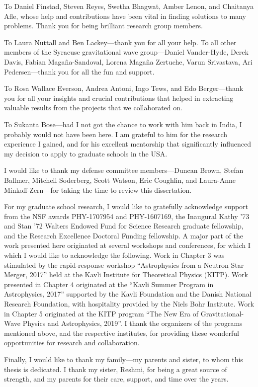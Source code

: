 To Daniel Finstad, Steven Reyes, Swetha Bhagwat, Amber Lenon, and Chaitanya Afle, whose help and contributions have been vital in finding solutions to many problems. Thank you for being brilliant research group members.

To Laura Nuttall and Ben Lackey---thank you for all your help. To all other members of the Syracuse gravitational wave group---Daniel Vander-Hyde, Derek Davis, Fabian Maga\~{n}a-Sandoval, Lorena Maga\~{n}a Zertuche, Varun Srivastava, Ari Pedersen---thank you for all the fun and support.

To Rosa Wallace Everson, Andrea Antoni, Ingo Tews, and Edo Berger---thank you for all your insights and crucial contributions that helped in extracting valuable results from the projects that we collaborated on.

To Sukanta Bose---had I not got the chance to work with him back in India, I probably would not have been here. I am grateful to him for the research experience I gained, and for his excellent mentorship that significantly influenced my decision to apply to graduate schools in the USA.

I would like to thank my defense committee members---Duncan Brown, Stefan Ballmer, Mitchell Soderberg, Scott Watson, Eric Coughlin, and Laura-Anne Minkoff-Zern---for taking the time to review this dissertation.

For my graduate school research, I would like to gratefully acknowledge support from the NSF awards PHY-1707954 and PHY-1607169, the Inaugural Kathy '73 and Stan '72 Walters Endowed Fund for Science Research graduate fellowship, and the Research Excellence Doctoral Funding fellowship. A major part of the work presented here originated at several workshops and conferences, for which I which I would like to acknowledge the following. Work in Chapter 3 was stimulated by the rapid-response workshop ``Astrophysics from a Neutron Star Merger, 2017'' held at the Kavli Institute for Theoretical Physics (KITP). Work presented in Chapter 4 originated at the ``Kavli Summer Program in Astrophysics, 2017'' supported by the Kavli Foundation and the Danish National Research Foundation, with hospitality provided by the Niels Bohr Institute. Work in Chapter 5 originated at the KITP program ``The New Era of Gravitational-Wave Physics and Astrophysics, 2019''. I thank the organizers of the programs mentioned above, and the respective institutes, for providing these wonderful opportunities for research and collaboration. %

Finally, I would like to thank my family---my parents and sister, to whom this thesis is dedicated. I thank my sister, Reshmi, for being a great source of strength, and my parents for their care, support, and time over the years.



